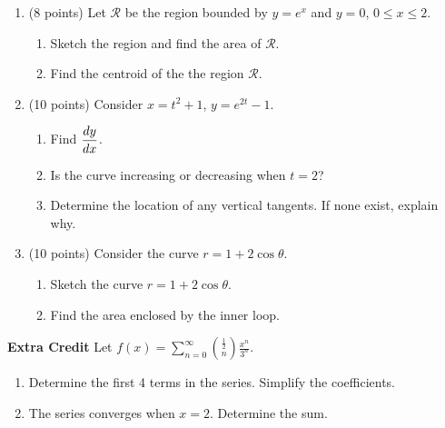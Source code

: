 \documentclass[11pt,fleqn]{article}
\begin{document}
\begin{enumerate}
\newpage

\item (8 points) Let $\mathcal{R}$ be the region bounded by $y = e^x$ and $y =
  0$, $0 \le x \le 2$. 
  \begin{enumerate}


  \item Sketch the region and find the area of $\mathcal{R}$.
\vskip2in

  \item Find the centroid of the the region $\mathcal{R}$. 
  \end{enumerate}

\newpage
\item (10 points) Consider $x = t^2 + 1$, $y = e^{2t} - 1$. 

  \begin{enumerate}
  \item Find $\displaystyle \frac{dy}{dx}$.

\vfill

\item Is the curve increasing or decreasing when $t=2$?
\vfill

  \item Determine the location of any vertical tangents. If none
    exist, explain why. 
\vfill
  \end{enumerate}
\newpage
\item (10 points) Consider the curve $r = 1 + 2 \cos \theta$. 

  \begin{enumerate}
  \item Sketch the curve $r = 1 + 2 \cos \theta$.

\vskip0.2in


  \item Find the area enclosed by the inner loop.
\vskip3.15in
\vfill

\vfill
  \end{enumerate}
\end{enumerate}
\newpage
\textbf{Extra Credit} Let $f(x) = \displaystyle{\sum_{n=0}^\infty { \frac{1}{2} \choose n} \frac{x^n}{3^n}}.$
	\begin{enumerate}
	\item Determine the first 4 terms in the series. Simplify the coefficients.
	\vfill
	\item The series converges when $x=2.$ Determine the sum.
	\vfill
	\end{enumerate}
\end{document}
